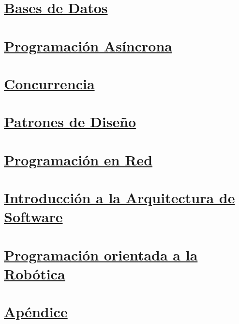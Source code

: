 \documentclass[a4paper, 12pt]{article}
\begin{document}
    \newpage\section*{\textbf{\underline{Bases de Datos}}}
    \newpage\section*{\textbf{\underline{Programación Asíncrona}}}
    \newpage\section*{\textbf{\underline{Concurrencia}}}
    \newpage\section*{\textbf{\underline{Patrones de Diseño}}}
    \newpage\section*{\textbf{\underline{Programación en Red}}}
    \newpage\section*{\textbf{\underline{Introducción a la Arquitectura de Software}}}
    \newpage\section*{\textbf{\underline{Programación orientada a la Robótica}}}
    \newpage\section*{\textbf{\underline{Apéndice}}}
\end{document}
